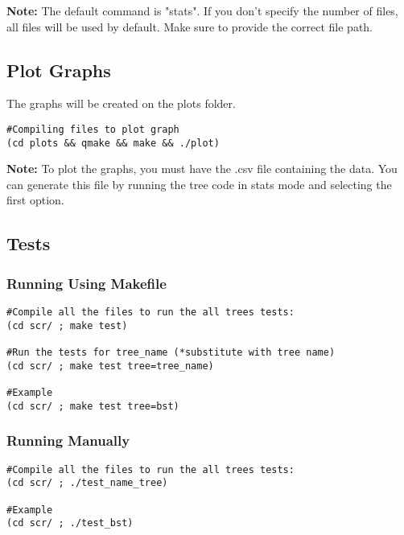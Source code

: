 \textbf{Note:} The default command is "stats". If you don't specify the number of files, all files will be used by default. Make sure to provide the correct file path.

\subsection{Plot Graphs}


The graphs will be created on the plots folder.

    \begin{verbatim}
#Compiling files to plot graph
(cd plots && qmake && make && ./plot)
    \end{verbatim}

\textbf{Note:} To plot the graphs, you must have the .csv file containing the data. You can generate this file by running the tree code in stats mode and selecting the first option.

\subsection{Tests}

\subsubsection{Running Using Makefile}
\begin{verbatim}
#Compile all the files to run the all trees tests:
(cd scr/ ; make test)

#Run the tests for tree_name (*substitute with tree name)
(cd scr/ ; make test tree=tree_name)

#Example
(cd scr/ ; make test tree=bst)
\end{verbatim}

\subsubsection{Running Manually}

\begin{verbatim}
#Compile all the files to run the all trees tests:
(cd scr/ ; ./test_name_tree)

#Example
(cd scr/ ; ./test_bst)
\end{verbatim}

